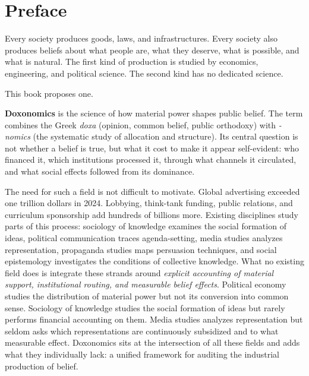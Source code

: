 \chapter*{Preface}

\noindent
Every society produces goods, laws, and infrastructures.
Every society also produces beliefs about what people are, what they deserve, what is possible, and what is natural.
The first kind of production is studied by economics, engineering, and political science.
The second kind has no dedicated science.

This book proposes one.

\textbf{Doxonomics} is the science of how material power shapes public belief.
The term combines the Greek \textit{doxa} (opinion, common belief, public orthodoxy) with \textit{-nomics} (the systematic study of allocation and structure).
Its central question is not whether a belief is true, but what it cost to make it appear self-evident: who financed it, which institutions processed it, through what channels it circulated, and what social effects followed from its dominance.

The need for such a field is not difficult to motivate.
Global advertising exceeded one trillion dollars in 2024.
Lobbying, think-tank funding, public relations, and curriculum sponsorship add hundreds of billions more.
Existing disciplines study parts of this process: sociology of knowledge examines the social formation of ideas, political communication traces agenda-setting, media studies analyzes representation, propaganda studies maps persuasion techniques, and social epistemology investigates the conditions of collective knowledge.
What no existing field does is integrate these strands around \emph{explicit accounting of material support, institutional routing, and measurable belief effects}.
Political economy studies the distribution of material power but not its conversion into common sense.
Sociology of knowledge studies the social formation of ideas but rarely performs financial accounting on them.
Media studies analyzes representation but seldom asks which representations are continuously subsidized and to what measurable effect.
Doxonomics sits at the intersection of all these fields and adds what they individually lack: a unified framework for auditing the industrial production of belief.

